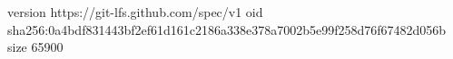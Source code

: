 version https://git-lfs.github.com/spec/v1
oid sha256:0a4bdf831443bf2ef61d161c2186a338e378a7002b5e99f258d76f67482d056b
size 65900
